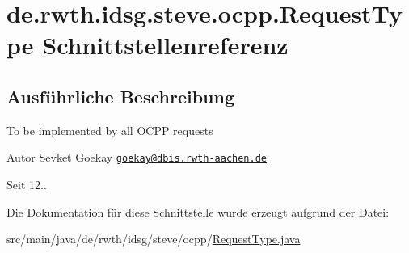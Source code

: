 \hypertarget{interfacede_1_1rwth_1_1idsg_1_1steve_1_1ocpp_1_1_request_type}{\section{de.\+rwth.\+idsg.\+steve.\+ocpp.\+Request\+Type Schnittstellenreferenz}
\label{interfacede_1_1rwth_1_1idsg_1_1steve_1_1ocpp_1_1_request_type}
}


\subsection{Ausführliche Beschreibung}
To be implemented by all O\+C\+P\+P requests

\begin{DoxyAuthor}{Autor}
Sevket Goekay \href{mailto:goekay@dbis.rwth-aachen.de}{\tt goekay@dbis.\+rwth-\/aachen.\+de} 
\end{DoxyAuthor}
\begin{DoxySince}{Seit}
12.. 
\end{DoxySince}


Die Dokumentation für diese Schnittstelle wurde erzeugt aufgrund der Datei\+:\begin{DoxyCompactItemize}
\item 
src/main/java/de/rwth/idsg/steve/ocpp/\hyperlink{_request_type_8java}{Request\+Type.\+java}\end{DoxyCompactItemize}
